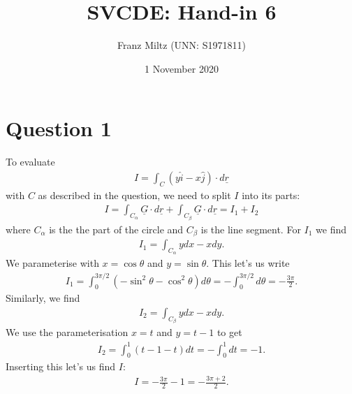 \documentclass{article}
\newcommand{\ih}{\widehat i}
\newcommand{\jh}{\widehat j}
\renewcommand{\vec}{\underline}
\begin{document}
\title{SVCDE: Hand-in 6}
\author{Franz Miltz (UNN: S1971811)}
\date{1 November 2020}
\maketitle
\section*{Question 1}
To evaluate
\begin{align*}
  I=\int_C \left(y\ih - x\jh\right)\cdot d\vec r 
\end{align*}
with $C$ as described in the question, we need to split $I$ into its 
parts:
\begin{align*}
  I = \int_{C_\alpha} \vec G \cdot d\vec r + \int_{C_\beta} \vec G \cdot d\vec r = I_1 + I_2
\end{align*}
where $C_\alpha$ is the the part of the circle and $C_\beta$ is the line segment.
For $I_1$ we find
\begin{align*}
  I_1 = \int_{C_\alpha} ydx-xdy.
\end{align*}
We parameterise with $x=\cos\theta$ and $y=\sin\theta$.
This let's us write
\begin{align*}
  I_1 = \int_0^{3\pi/2} \left(-\sin^2\theta - \cos^2\theta\right) d\theta
  =-\int_0^{3\pi/2}d\theta=-\frac{3\pi}{2}.
\end{align*}
Similarly, we find
\begin{align*}
  I_2 = \int_{C_\beta} ydx-xdy.
\end{align*}
We use the parameterisation $x=t$ and $y=t-1$ to get
\begin{align*}
  I_2 = \int_0^1 (t-1-t)dt=-\int_0^1 dt = -1.
\end{align*}
Inserting this let's us find $I$:
\begin{align*}
  I = -\frac{3\pi}{2}-1 = -\frac{3\pi + 2}{2}.
\end{align*}
\end{document}
